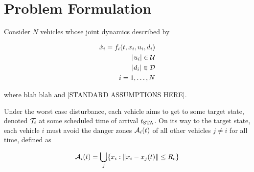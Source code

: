 \section{Problem Formulation \label{sec:formulation}}
Consider $N$ vehicles whose joint dynamics described by

\begin{equation}
\begin{aligned}
\dot{x}_i = f_i(t, x_i, u_i, d_i) \\
|u_i| \in \mathcal{U} \\
|d_i| \in \mathcal{D} \\
i = 1,\ldots, N
\end{aligned}
\end{equation}

where blah blah and [STANDARD ASSUMPTIONS HERE].

Under the worst case disturbance, each vehicle aims to get to some target state, denoted $\mathcal{T}_{i}$ at some scheduled time of arrival $t_\text{STA}$. On its way to the target state, each vehicle $i$ must avoid the danger zones $\mathcal{A}_{i}(t)$ of all other vehicles $j\neq i$ for all time, defined as

\begin{equation}
\mathcal{A}_{i}(t) = \bigcup_j \{x_i: \|x_i - x_j(t)\| \le R_c \}
\end{equation}
